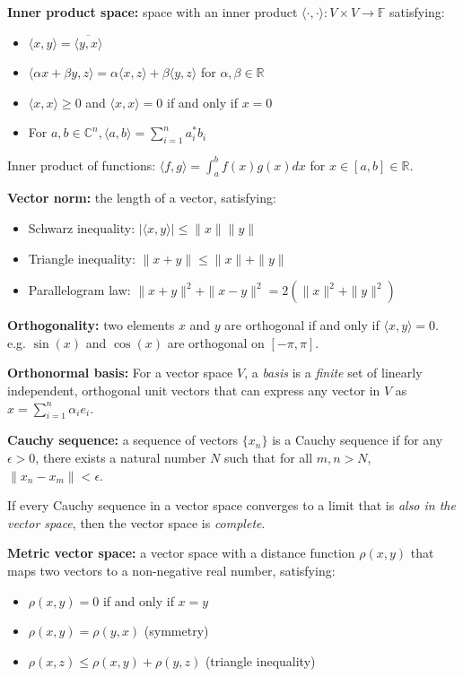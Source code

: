 \documentclass[12pt]{article}
\begin{document}
\textbf{Inner product space:} space with an inner product $\langle \cdot, \cdot \rangle: V \times V \to \mathbb{F}$ satisfying:
\begin{itemize}
    \item $\langle x, y \rangle = \overline{\langle y, x \rangle}$
    \item $\langle \alpha x + \beta y, z \rangle = \alpha \langle x, z \rangle + \beta \langle y, z \rangle$ for $\alpha, \beta \in \mathbb{R}$
    \item $\langle x,x \rangle \geq 0$ and $\langle x,x \rangle = 0$ if and only if $x = 0$
    \item For $a, b \in \mathbb{C}^n, \langle a, b \rangle = \sum_{i=1}^n a^*_i b_i$
\end{itemize}
Inner product of functions: $\langle f, g \rangle = \int^b_a f(x) g(x) dx$ for $x \in [a,b] \in \mathbb{R}$.

\textbf{Vector norm:} the length of a vector, satisfying:
\begin{itemize}
    \item Schwarz inequality: $|\langle x, y \rangle| \leq \|x\| \|y\|$
    \item Triangle inequality: $\|x + y\| \leq \|x\| + \|y\|$
    \item Parallelogram law: $\|x + y\|^2 + \|x - y\|^2 = 2(\|x\|^2 + \|y\|^2)$
\end{itemize}

\textbf{Orthogonality:} two elements $x$ and $y$ are orthogonal if and only if $\langle x, y \rangle = 0$. e.g. $\sin(x)$ and $\cos(x)$ are orthogonal on $[-\pi, \pi]$.

\textbf{Orthonormal basis:} For a vector space $V$, a \textit{basis} is a \textit{finite} set of linearly independent, orthogonal unit vectors that can express any vector in $V$ as $x = \sum_{i=1}^n \alpha_i e_i$.

\textbf{Cauchy sequence:} a sequence of vectors $\{x_n\}$ is a Cauchy sequence if for any $\epsilon > 0$, there exists a natural number $N$ such that for all $m, n > N$, $\|x_n - x_m\| < \epsilon$.

If every Cauchy sequence in a vector space converges to a limit that is \textit{also in the vector space}, then the vector space is \textit{complete}.

\textbf{Metric vector space:} a vector space with a distance function $\rho(x,y)$ that maps two vectors to a non-negative real number, satisfying:
\begin{itemize}
    \item $\rho(x,y) = 0$ if and only if $x = y$
    \item $\rho(x,y) = \rho(y,x)$ (symmetry)
    \item $\rho(x,z) \leq \rho(x,y) + \rho(y,z)$ (triangle inequality)
\end{itemize}
\end{document}
